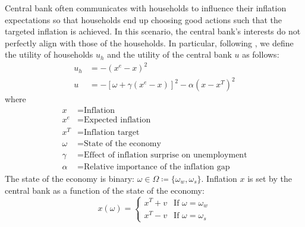 \documentclass[12pt,a4paper]{article}
\begin{document}
Central bank often communicates with households to influence their inflation expectations so that households end up choosing good actions such that the targeted inflation is achieved. In this scenario, the central bank's interests do not perfectly align with those of the households. In particular, following \cite{Ko2022}, we define the utility of households $u_h$ and the utility of the central bank $u$ as follows:
\begin{align}
    \label{uh}
    u_h & = -\left(x^e - x\right)^2 \\
    \label{uc}
    u & = -\left[\omega+\gamma(x^e-x)\right]^2-\alpha(x-x^T)^2
\end{align}
where
\begin{align*}
    x & = \mbox{Inflation} \\
    x^e & = \mbox{Expected inflation} \\
    x^T & = \mbox{Inflation target} \\
    \omega & = \mbox{State of the economy}\\
    \gamma & = \mbox{Effect of inflation surprise on unemployment} \\
    \alpha & = \mbox{Relative importance of the inflation gap} 
\end{align*}
The state of the economy is binary: $\omega\in\Omega\coloneqq\{\omega_w,\omega_s\}$. Inflation $x$ is set by the central bank as a function of the state of the economy: 
\begin{equation}
    x(\omega)=\left\{
    \begin{array}{cc}
      x^T+v   &  \mbox{If } \omega=\omega_w\\
      x^T-v   &  \mbox{If } \omega=\omega_s
    \end{array}
    \right.
\end{equation}
\end{document}
